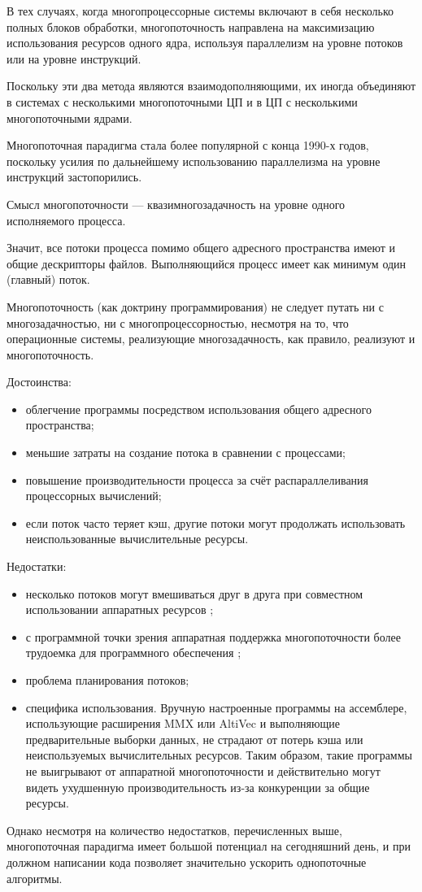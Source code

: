 \documentclass[a4paper,oneside,14pt]{extreport}
\begin{document}
В тех случаях, когда многопроцессорные системы включают в себя несколько полных блоков обработки,
многопоточность направлена на максимизацию использования ресурсов одного ядра,
используя параллелизм на уровне потоков или на уровне инструкций.

Поскольку эти два метода являются взаимодополняющими,
их иногда объединяют в системах с несколькими многопоточными ЦП
и в ЦП с несколькими многопоточными ядрами.

Многопоточная парадигма стала более популярной с конца 1990-х годов,
поскольку усилия по дальнейшему использованию параллелизма на уровне инструкций застопорились.

Смысл многопоточности — квазимногозадачность на уровне одного исполняемого процесса.

Значит, все потоки процесса помимо общего адресного пространства имеют и общие дескрипторы файлов.
Выполняющийся процесс имеет как минимум один (главный) поток.

Многопоточность (как доктрину программирования) не следует путать ни с многозадачностью,
ни с многопроцессорностью, несмотря на то, что операционные системы,
реализующие многозадачность, как правило, реализуют и многопоточность.

Достоинства:
\begin{itemize}
	\item облегчение программы посредством использования общего адресного пространства;
	\item меньшие затраты на создание потока в сравнении с процессами;
	\item повышение производительности процесса за счёт распараллеливания процессорных вычислений;
	\item если поток часто теряет кэш, другие потоки могут продолжать
	использовать неиспользованные вычислительные ресурсы.
\end{itemize}

Недостатки:
\begin{itemize}
	\item несколько потоков могут вмешиваться друг в друга при совместном
	использовании аппаратных ресурсов \cite{Nemirovsky};
	\item с программной точки зрения аппаратная поддержка многопоточности
	более трудоемка для программного обеспечения \cite{Olukotun};
	\item проблема планирования потоков;
	\item специфика использования. Вручную настроенные программы на ассемблере,
	использующие расширения MMX или AltiVec и выполняющие предварительные выборки данных,
	не страдают от потерь кэша или неиспользуемых вычислительных ресурсов.
	Таким образом, такие программы не выигрывают от аппаратной многопоточности
	и действительно могут видеть ухудшенную производительность из-за конкуренции за общие ресурсы.
\end{itemize}
	Однако несмотря на количество недостатков, перечисленных выше,
	многопоточная парадигма имеет большой потенциал на сегодняшний день,
	и при должном написании кода позволяет значительно ускорить однопоточные алгоритмы.
	
\end{document}
